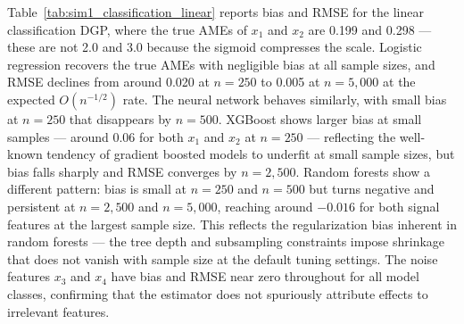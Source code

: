 \documentclass[12pt,a4paper]{article}
\numberwithin{equation}{section}
\theoremstyle{plain}
\theoremstyle{definition}
\begin{document}
	Table~\ref{tab:sim1_classification_linear} reports bias and RMSE for the linear classification DGP, where the true AMEs of $x_1$ and $x_2$ are 0.199 and 0.298 --- these are not 2.0 and 3.0 because the sigmoid compresses the scale. Logistic regression recovers the true AMEs with negligible bias at all sample sizes, and RMSE declines from around 0.020 at $n=250$ to 0.005 at $n=5{,}000$ at the expected $O(n^{-1/2})$ rate. The neural network behaves similarly, with small bias at $n=250$ that disappears by $n=500$. XGBoost shows larger bias at small samples --- around 0.06 for both $x_1$ and $x_2$ at $n=250$ --- reflecting the well-known tendency of gradient boosted models to underfit at small sample sizes, but bias falls sharply and RMSE converges by $n=2{,}500$. Random forests show a different pattern: bias is small at $n=250$ and $n=500$ but turns negative and persistent at $n=2{,}500$ and $n=5{,}000$, reaching around $-0.016$ for both signal features at the largest sample size. This reflects the regularization bias inherent in random forests --- the tree depth and subsampling constraints impose shrinkage that does not vanish with sample size at the default tuning settings. The noise features $x_3$ and $x_4$ have bias and RMSE near zero throughout for all model classes, confirming that the estimator does not spuriously attribute effects to irrelevant features.
	
\end{document}

